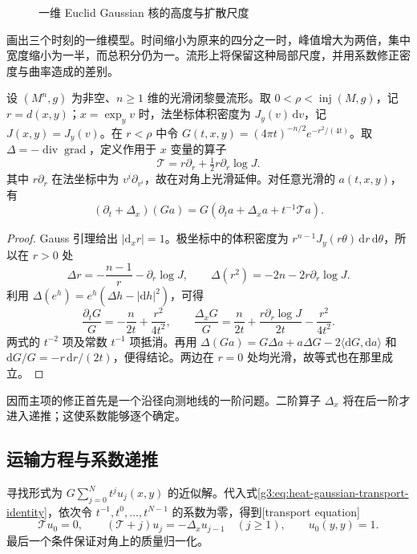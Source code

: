 \begin{figure}[htbp]
	\centering
	
	\caption{一维 Euclid Gaussian 核的高度与扩散尺度}
	\label{g3:fig:gaussian-scale}
\end{figure}

画出三个时刻的一维模型。时间缩小为原来的四分之一时，峰值增大为两倍，集中宽度缩小为一半，而总积分仍为一。流形上将保留这种局部尺度，并用系数修正密度与曲率造成的差别。

\begin{lemma}\label{g3:lem:heat-gaussian-transport-identity}
	设 \((M^n,g)\) 为非空、\(n\ge1\) 维的光滑闭黎曼流形。取 \(0<\rho<\operatorname{inj}(M,g)\)，记 \(r=d(x,y)\)；\(x=\exp_yv\) 时，法坐标体积密度为 \(J_y(v)\,\mathrm dv\)，记 \(J(x,y)=J_y(v)\)。在 \(r<\rho\) 中令 \(G(t,x,y)=(4\pi t)^{-n/2}e^{-r^2/(4t)}\)。取 \(\Delta=-\operatorname{div}\operatorname{grad}\)，定义作用于 \(x\) 变量的算子
	\[
		\mathcal T=r\partial_r+\tfrac12r\partial_r\log J.
	\]
	其中 \(r\partial_r\) 在法坐标中为 \(v^i\partial_{v^i}\)，故在对角上光滑延伸。对任意光滑的 \(a(t,x,y)\)，有
	\begin{equation}\label{g3:eq:heat-gaussian-transport-identity}
		(\partial_t+\Delta_x)(Ga)
		=G\left(\partial_ta+\Delta_xa+t^{-1}\mathcal Ta\right).
	\end{equation}
\end{lemma}
\begin{proof}
	Gauss 引理给出 \(|\mathrm d_xr|=1\)。极坐标中的体积密度为 \(r^{n-1}J_y(r\theta)\,\mathrm dr\,\mathrm d\theta\)，所以在 \(r>0\) 处
	\[
		\Delta r=-\frac{n-1}{r}-\partial_r\log J,
		\qquad \Delta(r^2)=-2n-2r\partial_r\log J.
	\]
	利用 \(\Delta(e^h)=e^h(\Delta h-|\mathrm dh|^2)\)，可得
	\[
		\frac{\partial_tG}{G}=-\frac n{2t}+\frac{r^2}{4t^2},
		\qquad
		\frac{\Delta_xG}{G}=\frac n{2t}
		+\frac{r\partial_r\log J}{2t}-\frac{r^2}{4t^2}.
	\]
	两式的 \(t^{-2}\) 项及常数 \(t^{-1}\) 项抵消。再用
	\(\Delta(Ga)=G\Delta a+a\Delta G-2\langle\mathrm dG,\mathrm da\rangle\)
	和 \(\mathrm dG/G=-r\,\mathrm dr/(2t)\)，便得结论。两边在 \(r=0\) 处均光滑，故等式也在那里成立。
\end{proof}

因而主项的修正首先是一个沿径向测地线的一阶问题。二阶算子 \(\Delta_x\) 将在后一阶才进入递推；这使系数能够逐个确定。

\subsection{运输方程与系数递推}
\label{g3:subsec:1602:02}
寻找形式为 \(G\sum_{j=0}^Nt^ju_j(x,y)\) 的近似解。代入式\eqref{g3:eq:heat-gaussian-transport-identity}，依次令 \(t^{-1},t^0,\ldots,t^{N-1}\) 的系数为零，得到[transport equation]
\begin{equation}\label{g3:eq:heat-transport-recursion}
	\mathcal Tu_0=0,\qquad
	(\mathcal T+j)u_j=-\Delta_xu_{j-1}\quad(j\ge1),
	\qquad u_0(y,y)=1.
\end{equation}
最后一个条件保证对角上的质量归一化。


